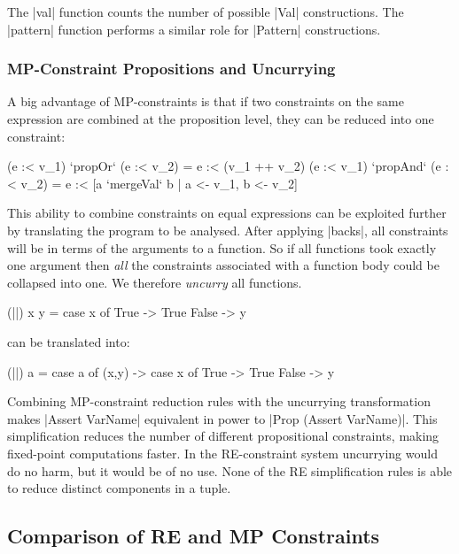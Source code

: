 \documentclass[preprint]{sigplanconf}
\begin{document}
The |val| function counts the number of possible |Val| constructions. The |pattern| function performs a similar role for |Pattern| constructions.


\subsubsection{MP-Constraint Propositions and Uncurrying}

A big advantage of MP-constraints is that if two constraints on the same expression are combined at the proposition level, they can be reduced into one constraint:

\ignore\begin{code}
(e :< v_1)  `propOr`   (e :< v_2) = e :< (v_1 ++ v_2)
(e :< v_1)  `propAnd`  (e :< v_2) = e :< [a `mergeVal` b | a <- v_1, b <- v_2]
\end{code}

\noindent This ability to combine constraints on equal expressions can be exploited further by translating the program to be analysed. After applying |backs|, all constraints will be in terms of the arguments to a function. So if all functions took exactly one argument then \textit{all} the constraints associated with a function body could be collapsed into one. We therefore \textit{uncurry} all functions.

\begin{example}
\begin{code}
(||) x y = case  x of
                 True   -> True
                 False  -> y
\end{code}

\noindent can be translated into:

\begin{code}
(||) a = case  a of
               (x,y) -> case  x of
                              True    -> True
                              False   -> y
\end{code}\codeexample
\end{example}

Combining MP-constraint reduction rules with the uncurrying transformation makes |Assert VarName| equivalent in power to |Prop (Assert VarName)|. This simplification reduces the number of different propositional constraints, making fixed-point computations faster. In the RE-constraint system uncurrying would do no harm, but it would be of no use. None of the RE simplification rules is able to reduce distinct components in a tuple.

\subsection{Comparison of RE and MP Constraints}
\end{document}
